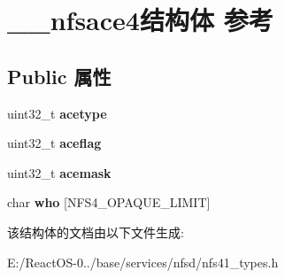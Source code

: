 \hypertarget{struct____nfsace4}{}\section{\+\_\+\+\_\+nfsace4结构体 参考}
\label{struct____nfsace4}
\subsection*{Public 属性}
\begin{DoxyCompactItemize}
\item 
\mbox{\label{struct____nfsace4_ade694ab323c7053004ba145c9f2c23b6}} 
uint32\+\_\+t {\bfseries acetype}
\item 
\mbox{\label{struct____nfsace4_a7e762edf4078865fc34ecd3dd2b8bb74}} 
uint32\+\_\+t {\bfseries aceflag}
\item 
\mbox{\label{struct____nfsace4_a3c06b3b44e1ac37b889b414b70397c61}} 
uint32\+\_\+t {\bfseries acemask}
\item 
\mbox{\label{struct____nfsace4_aa0524aea135fcc7766e1ccae4fae2682}} 
char {\bfseries who} \mbox{[}N\+F\+S4\+\_\+\+O\+P\+A\+Q\+U\+E\+\_\+\+L\+I\+M\+IT\mbox{]}
\end{DoxyCompactItemize}


该结构体的文档由以下文件生成\+:\begin{DoxyCompactItemize}
\item 
E\+:/\+React\+O\+S-\/0../base/services/nfsd/nfs41\+\_\+types.\+h\end{DoxyCompactItemize}
